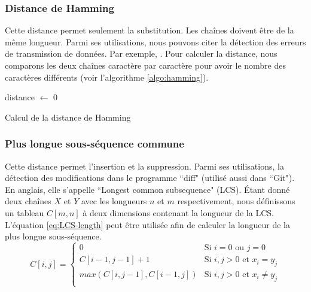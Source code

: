 \documentclass{KodeBook}
\begin{document}
\subsubsection{Distance de Hamming}

Cette distance permet seulement la substitution.
Les chaînes doivent être de la même longueur.
Parmi ses utilisations, nous pouvons citer la détection des erreurs de transmission de données.\newline
Par exemple, .
Pour calculer la distance, nous comparons les deux chaînes caractère par caractère pour avoir le nombre des caractères différents (voir l'algorithme \ref{algo:hamming}).

\begin{algorithm}[H]
	distance $\leftarrow$ 0\;
	

	\caption{Calcul de la distance de Hamming \label{algo:hamming}}
	
\end{algorithm}


\subsubsection{Plus longue sous-séquence commune}

Cette distance permet l'insertion et la suppression.
Parmi ses utilisations, la détection des modifications dans le programme ``diff" (utilisé aussi dans ``Git").
En anglais, elle s'appelle ``Longest common subsequence" (LCS).
Étant donné deux chaînes $X$ et $Y$ avec les longueurs $n$ et $m$ respectivement, nous définissons un tableau $C[m, n]$ à deux dimensions contenant la longueur de la LCS.
L'équation \ref{eq:LCS-length} peut être utilisée afin de calculer la longueur de la plus longue sous-séquence. 
\begin{equation}
	C[i, j] =  
	\begin{cases}
		0 & \text{Si } i = 0 \text{ ou } j=0\\
		C[i-1, j-1] + 1 & \text{Si } i,j > 0 \text{ et } x_i = y_j\\
		max (C[i, j-1], C[i-1, j]) & \text{Si } i,j > 0 \text{ et } x_i \ne y_j\\
	\end{cases}
	\label{eq:LCS-length}
\end{equation}
\end{document}
